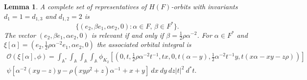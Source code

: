 \documentclass[12pt]{amsart}
\newcommand{\abs}[1]{\left|{#1}\right|}
\newcommand{\A}{\mathbb{A}}
\renewcommand{\O}{\mathcal{O}}
\newtheorem{lemma}[theorem]{Lemma}
\theoremstyle{remark}
\begin{document}
\begin{lemma}\label{relevant-4}
A complete set of representatives of $H(F)$-orbits with invariants $d_1=1=d_{1,3}$ and $d_{1,2}=2$ is 
\[
\{(e_2,\beta e_1,\alpha e_2,0):\alpha\in F,\,\beta\in F^*\}.
\]
The vector $(e_2,\beta e_1,\alpha e_2,0)$ is relevant if and only if $\beta=\frac12 \rho\alpha^{-2}$. For $\alpha\in F^*$ and $\xi[\alpha]=(e_2,\frac12 \rho\alpha^{-2} e_1,\alpha e_2,0)$ the associated orbital integral is
\begin{multline*}
\O(\xi[\alpha],\phi)=\int_{\A^*}\int_\A\int_\A\int_\A \phi_{K_2}[(0,t,\frac12 \rho\alpha^{-2}t^{-1},tx,0,t(\alpha-y),\frac12\alpha^{-2}t^{-1}y,t(x\alpha-xy-z\rho))] \\ \psi[\alpha^{-2}(xy-z)y-\rho(xy\rho^2+z)\alpha^{-1}+x+y] \ dx\ dy\ dz\abs{t}^2\ d^*t.
\end{multline*}
\end{lemma}
\end{document}
